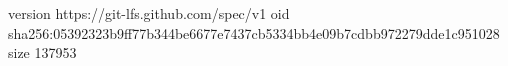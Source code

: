 version https://git-lfs.github.com/spec/v1
oid sha256:05392323b9ff77b344be6677e7437cb5334bb4e09b7cdbb972279dde1c951028
size 137953
